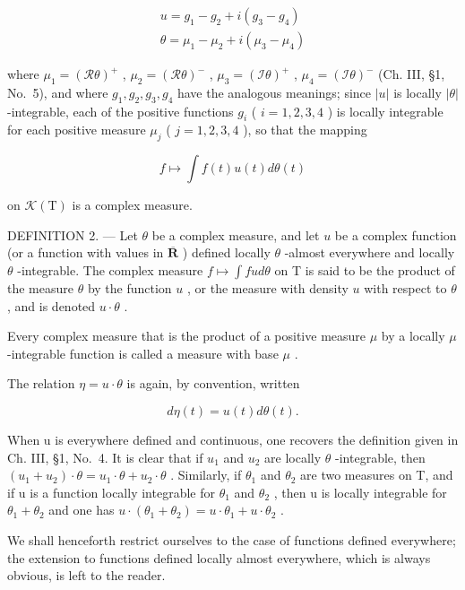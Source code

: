 \[
\begin{array}{l} {u = g _ {1} - g _ {2} + i (g _ {3} - g _ {4})} \\ {\theta = \mu_ {1} - \mu_ {2} + i (\mu_ {3} - \mu_ {4})} \end{array}\tag{2}
\]

where \(\mu_{1} = (\mathcal{R}\theta)^{+}\) , \(\mu_{2} = (\mathcal{R}\theta)^{-}\) , \(\mu_{3} = (\mathcal{I}\theta)^{+}\) , \(\mu_{4} = (\mathcal{I}\theta)^{-}\) (Ch. III, §1, No.~5), and where \(g_{1}, g_{2}, g_{3}, g_{4}\) have the analogous meanings; since \(|u|\) is locally \(|\theta|\) -integrable, each of the positive functions \(g_{i}\) ( \(i = 1, 2, 3, 4\) ) is locally integrable for each positive measure \(\mu_{j}\) ( \(j = 1, 2, 3, 4\) ), so that the mapping

\[
f \mapsto \int f (t) u (t) d \theta (t)
\]

on \(\mathcal{K}(\mathrm{T})\) is a complex measure.

DEFINITION 2. --- Let \(\theta\) be a complex measure, and let \(u\) be a complex function (or a function with values in \(\overline{\mathbf{R}}\) ) defined locally \(\theta\) -almost everywhere and locally \(\theta\) -integrable. The complex measure \(f \mapsto \int f u d\theta\) on T is said to be the product of the measure \(\theta\) by the function \(u\) , or the measure with density \(u\) with respect to \(\theta\) , and is denoted \(u \cdot \theta\) .

Every complex measure that is the product of a positive measure \(\mu\) by a locally \(\mu\) -integrable function is called a measure with base \(\mu\) .

The relation \(\eta = u \cdot \theta\) is again, by convention, written

\[
d \eta (t) = u (t) d \theta (t).
\]

When u is everywhere defined and continuous, one recovers the definition given in Ch. III, §1, No.~4. It is clear that if \(u_{1}\) and \(u_{2}\) are locally \(\theta\) -integrable, then \((u_{1}+u_{2})\cdot\theta=u_{1}\cdot\theta+u_{2}\cdot\theta\) . Similarly, if \(\theta_{1}\) and \(\theta_{2}\) are two measures on T, and if u is a function locally integrable for \(\theta_{1}\) and \(\theta_{2}\) , then u is locally integrable for \(\theta_{1}+\theta_{2}\) and one has \(u\cdot(\theta_{1}+\theta_{2})=u\cdot\theta_{1}+u\cdot\theta_{2}\) .

We shall henceforth restrict ourselves to the case of functions defined everywhere; the extension to functions defined locally almost everywhere, which is always obvious, is left to the reader.


